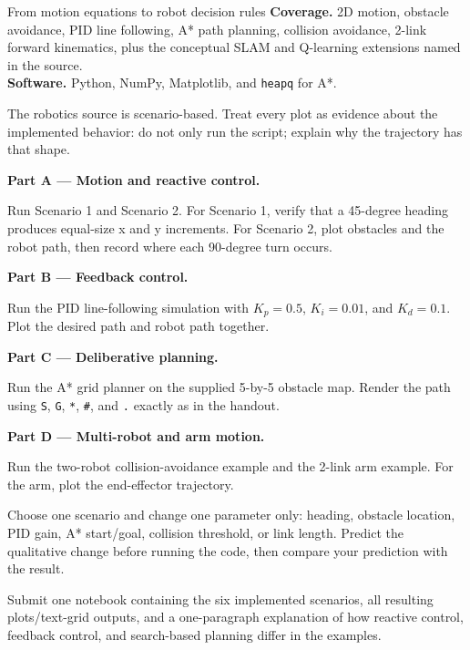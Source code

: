 
\begin{labproject}{From motion equations to robot decision rules}
\textbf{Coverage.} 2D motion, obstacle avoidance, PID line following, A* path planning, collision avoidance, 2-link forward kinematics, plus the conceptual SLAM and Q-learning extensions named in the source.\\
\textbf{Software.} Python, NumPy, Matplotlib, and \texttt{heapq} for A*.

\begin{labmode}
The robotics source is scenario-based. Treat every plot as evidence about the implemented behavior: do not only run the script; explain why the trajectory has that shape.
\end{labmode}

\medskip\noindent\textbf{Part A --- Motion and reactive control.}\par
Run Scenario 1 and Scenario 2. For Scenario 1, verify that a 45-degree heading produces equal-size x and y increments. For Scenario 2, plot obstacles and the robot path, then record where each 90-degree turn occurs.

\medskip\noindent\textbf{Part B --- Feedback control.}\par
Run the PID line-following simulation with \(K_p=0.5\), \(K_i=0.01\), and \(K_d=0.1\). Plot the desired path and robot path together.

\medskip\noindent\textbf{Part C --- Deliberative planning.}\par
Run the A* grid planner on the supplied 5-by-5 obstacle map. Render the path using \texttt{S}, \texttt{G}, \texttt{*}, \texttt{\#}, and \texttt{.} exactly as in the handout.

\medskip\noindent\textbf{Part D --- Multi-robot and arm motion.}\par
Run the two-robot collision-avoidance example and the 2-link arm example. For the arm, plot the end-effector trajectory.

\begin{tryit}
Choose one scenario and change one parameter only: heading, obstacle location, PID gain, A* start/goal, collision threshold, or link length. Predict the qualitative change before running the code, then compare your prediction with the result.
\end{tryit}
\end{labproject}

\begin{labdeliverable}
Submit one notebook containing the six implemented scenarios, all resulting plots/text-grid outputs, and a one-paragraph explanation of how reactive control, feedback control, and search-based planning differ in the examples.
\end{labdeliverable}
